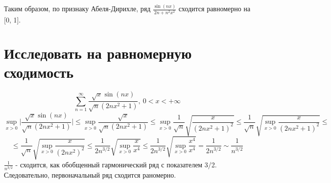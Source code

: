 \documentclass{article}
\begin{document}
Таким образом, по признаку Абеля-Дирихле, ряд \(\frac{\sin(nx)}{2n+n^2x^2}\) сходится равномерно на [0, 1].


\section{Исследовать на равномерную сходимость}
\[
    \sum\limits_{n=1}^\infty \frac{\sqrt{x}\sin(nx)}{\sqrt{n}(2nx^2 + 1)}, \ 0 < x < +\infty
\]
\[
    \sup\limits_{x > 0} \bigg|\frac{\sqrt{x}\sin(nx)}{\sqrt{n}(2nx^2 + 1)} \bigg| \le \sup\limits_{x > 0} \frac{\sqrt{x}}{\sqrt{n}(2nx^2 + 1)} \le  \sup\limits_{x > 0} \frac{1}{\sqrt{n}} \sqrt{\frac{x}{(2nx^2 + 1)^2}} \le \frac{1}{\sqrt{n}} \sqrt{\sup\limits_{x > 0} \frac{x}{(2nx^2 + 1)^2}} \le
\]
\[
    \le \frac{1}{\sqrt{n}} \sqrt{\sup\limits_{x > 0} \frac{x}{(2nx^2)^2}} \le \frac{1}{2n^{3/2}} \sqrt{\sup\limits_{x> 0} \frac{x}{x^4}} \le \frac{1}{2n^{3/2}} \sqrt{\sup\limits_{x> 0} \frac{x^4}{x^4}} = \frac{1}{2n^{3/2}} \sim \frac{1}{n^{3/2}}
\]
$\frac{1}{n^{3/2}}$ - сходится, как обобщенный гармонический ряд с показателем 3/2. Следовательно, первоначальный ряд сходится раномерно.
\end{document}
